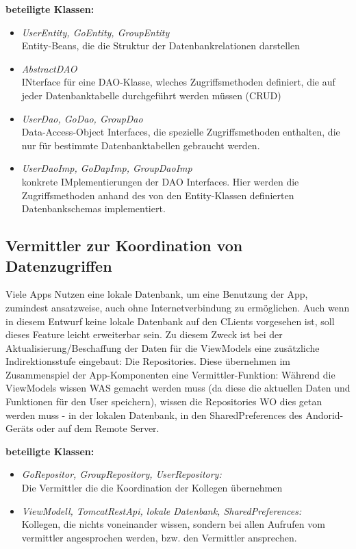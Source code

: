 \textbf{beteiligte Klassen:}
\begin{itemize}
	\item \textit{UserEntity, GoEntity, GroupEntity}\\ Entity-Beans, die die Struktur der Datenbankrelationen darstellen
	\item \textit{AbstractDAO}\\ INterface für eine DAO-Klasse, wleches Zugriffsmethoden definiert, die auf jeder Datenbanktabelle durchgeführt werden müssen (CRUD)
	\item \textit{UserDao, GoDao, GroupDao}\\ Data-Access-Object Interfaces, die spezielle Zugriffsmethoden enthalten, die nur für bestimmte Datenbanktabellen gebraucht werden.
	\item \textit{UserDaoImp, GoDapImp, GroupDaoImp}\\ konkrete IMplementierungen der DAO Interfaces. Hier werden die Zugriffsmethoden anhand des von den Entity-Klassen definierten Datenbankschemas
	implementiert.
\end{itemize}

\subsection{Vermittler zur Koordination von Datenzugriffen}\label{Vermittler}
Viele Apps Nutzen eine lokale Datenbank, um eine Benutzung der App, zumindest ansatzweise, auch ohne Internetverbindung zu ermöglichen. Auch wenn in diesem Entwurf keine lokale Datenbank auf den CLients vorgesehen ist, soll dieses Feature leicht erweiterbar sein. Zu diesem Zweck ist bei der Aktualisierung/Beschaffung der Daten für die ViewModels eine zusätzliche Indirektionsstufe eingebaut: Die Repositories. Diese übernehmen im Zusammenspiel der App-Komponenten eine Vermittler-Funktion: Während die ViewModels wissen WAS gemacht werden muss (da diese die aktuellen Daten und Funktionen für den User speichern), wissen die Repositories WO dies getan werden muss - in der lokalen Datenbank, in den SharedPreferences des Andorid-Geräts oder auf dem Remote Server.

\textbf{beteiligte Klassen:}
\begin{itemize}
	\item \textit{GoRepositor, GroupRepository, UserRepository:}\\
	 Die Vermittler die die Koordination der Kollegen übernehmen
	\item \textit{ViewModell, TomcatRestApi, lokale Datenbank, SharedPreferences:}\\ Kollegen, die nichts voneinander wissen, sondern bei allen Aufrufen vom vermittler angesprochen werden, bzw. den Vermittler ansprechen.
\end{itemize}

